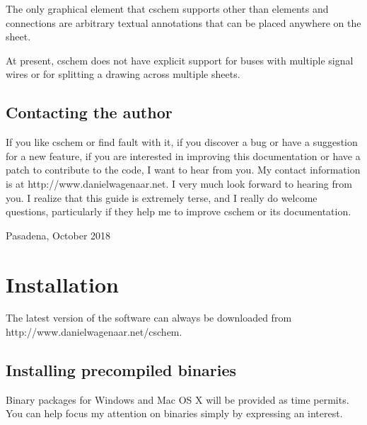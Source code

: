 \documentclass[11pt]{report}
\begin{document}
The only graphical element that cschem supports other than elements
and connections are arbitrary textual annotations that can be placed anywhere on
the sheet.

At present, cschem does not have explicit support for buses with
multiple signal wires or for splitting a drawing across multiple sheets.

\section{Contacting the author}

If you like cschem or find fault with it, if you discover a bug or have a
suggestion for a new feature, if you are interested in improving this
documentation or have a patch to contribute to the code, I want to
hear from you. My contact information is at
http://www.danielwagenaar.net. I very much look forward to hearing
from you. I realize that this guide is extremely terse, and I
really do welcome questions, particularly if they help me to improve
cschem or its documentation.\bigskip

\noindent Pasadena, October 2018

\chapter{Installation}

The latest version of the software can always be downloaded from\break
http://www.danielwagenaar.net/cschem.

\section{Installing precompiled binaries}

Binary packages for Windows and Mac OS X will be provided as time
permits. You can help focus my attention on binaries simply by
expressing an interest.

\end{document}
